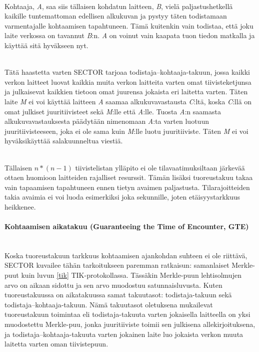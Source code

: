 \documentclass[finnish]{tktltiki2}
\theoremstyle{definition}
\theoremstyle{remark}
\begin{document}
\noindent\\
Kohtaaja, \emph{A}, saa siis tällaisen kohdatun laitteen, \emph{B}, vielä paljastushetkellä kaikille tuntemattoman edellisen alkukuvan ja pystyy täten todistamaan varmentajalle kohtaamisen tapahtuneen. Tämä kuitenkin vain todistaa, että joku laite verkossa on tavannut \emph{B}:n. \emph{A} on voinut vain kaapata tuon tiedon matkalla ja käyttää sitä hyväkseen nyt. 

\noindent\\
Tätä haastetta varten SECTOR tarjoaa todistaja--kohtaaja-takuun, jossa kaikki verkon laitteet luovat kaikkia muita verkon laitteita varten omat tiivisteketjunsa ja julkaisevat kaikkien tietoon omat juurensa jokaista eri laitetta varten. Täten laite \emph{M} ei voi käyttää laitteen \emph{A} saamaa alkukuvavastausta \emph{C}:ltä, koska \emph{C}:llä on omat julkiset juuritiivisteet sekä \emph{M}:lle että \emph{A}:lle. Tuosta \emph{A}:n saamasta alkukuvavastauksesta päädytään nimenomaan \emph{A}:ta varten luotuun juuritiivisteeseen, joka ei ole sama kuin \emph{M}:lle luotu juuritiiviste. Täten \emph{M} ei voi hyväksikäyttää salakuunneltua viestiä.

\noindent\\
Tällaisen $n*(n-1)$ tiivistelistan ylläpito ei ole tilavaatimuksiltaan järkevää ottaen huomioon laitteiden rajalliset resurssit. Tämän lisäksi tuoreustakuu takaa vain tapaamisen tapahtuneen ennen tietyn avaimen paljastusta. Tilarajoitteiden takia avaimia ei voi luoda esimerkiksi joka sekunnille, joten etäisyystarkkuus heikkenee.

\paragraph{Kohtaamisen aikatakuu (Guaranteeing the Time of Encounter, GTE)}
\noindent\\
Koska tuoreustakuun tarkkuus kohtaamisen ajankohdan suhteen ei ole riittävä, SECTOR kuvailee tähän tarkoitukseen paremman ratkaisun: samanlaiset Merkle-puut kuin luvun \ref{tik} TIK-protokollassa. Tässäkin Merkle-puun lehtisolmujen arvo on aikaan sidottu ja sen arvo muodostuu satunnaisluvusta. Kuten tuoreustakuussa on aikatakuussa samat takuutasot: todistaja-takuun sekä todistaja--kohtaaja-takuun. Nämä takuutasot oletuksena mukailevat tuoreustakuun toimintaa eli todistaja-takuuta varten jokaisella laitteella on yksi muodostettu Merkle-puu, jonka juuritiiviste toimii sen julkisena allekirjoituksena, ja todistaja--kohtaaja-takuuta varten jokainen laite luo jokaista verkon muuta laitetta varten oman tiivistepuun.
\end{document}
